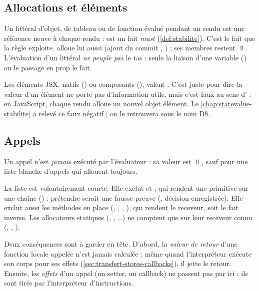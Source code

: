 \subsection{Allocations et éléments}

Un littéral d'objet, de tableau ou de fonction évalué pendant un rendu est
une référence neuve à chaque rendu :  est un fait
\emph{must} (\cref{def:stabilite}). C'est le fait que la règle
 exploite.  alloue lui aussi
(ajout du commit \snapshotCommit{}, ) ; ses membres restent
$\Top$. L'évaluation d'un littéral \emph{ne peuple pas} le tas : seule la
liaison d'une variable () ou le passage en prop le fait.

Les éléments JSX, natifs () ou composants (),
valent . C'est juste pour dire \og la valeur d'un élément
ne porte pas d'information utile\fg{}, mais c'est faux au sens
d' : en JavaScript, chaque rendu alloue un nouvel objet
élément. Le \cref{chap:statevalue-stabilite} a relevé ce faux négatif ; on
le retrouvera sous le nom D8.

\subsection{Appels}

Un appel n'est \emph{jamais} exécuté par l'évaluateur : sa valeur est $\Top$,
sauf pour une liste blanche d'appels qui allouent toujours.


La liste est volontairement courte. Elle exclut  et
, qui rendent une primitive sur une chaîne
() : prétendre  serait une fausse
preuve (, décision enregistrée). Elle exclut aussi les méthodes en
place (, , , ), qui
rendent le receveur, soit le fait inverse. Les allocateurs statiques
(, , \ldots) ne comptent que sur leur
receveur connu (, , ).

Deux conséquences sont à garder en tête. D'abord, la \emph{valeur de retour}
d'une fonction locale appelée n'est jamais calculée : même quand
l'interpréteur exécute son corps pour ses effets
(\cref{sec:transfert-stores-callbacks}), il jette le retour. Ensuite, les
\emph{effets} d'un appel (un setter, un callback) ne passent pas par ici :
ils sont tirés par l'interpréteur d'instructions.

